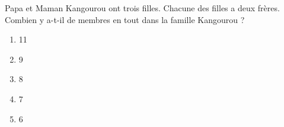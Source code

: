 Papa et Maman Kangourou ont trois filles. Chacune des filles a deux frères.\\Combien y a-t-il de membres en tout dans la famille Kangourou ?
\begin{multicols}{5}
  \begin{enumerate}[A/]
  \item 11
  \item 9
  \item 8
  \item 7
  \item 6
  \end{enumerate}
\end{multicols}